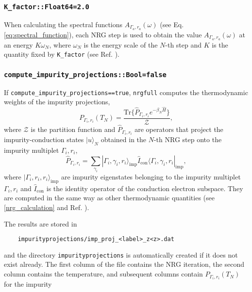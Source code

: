 \documentclass[notitlepage]{article}
\newcommand{\ket}[1]{|#1\rangle}
\newcommand{\bra}[1]{\langle #1 |}
\begin{document}
\subsubsection{\texttt{K\_factor::Float64=2.0}}
\label{nrg_Kfactor}
When calculating the spectral functions
$A_{\Gamma_a,r_a}(\omega)$ (see Eq.
\ref{eq:spectral_function}), each NRG step is used to obtain
the value $A_{\Gamma_a,r_a}(\omega)$ at an energy
$K\omega_N$, where $\omega_N$ is the energy scale of the
$N$-th step and $K$ is the quantity fixed by
\texttt{K\_factor} (see Ref. \cite{bulla2008}).

\subsubsection{\texttt{compute\_impurity\_projections::Bool=false}}
\label{nrg_computeimpurityprojections}
If \texttt{compute\_impurity\_projections==true},
\texttt{nrgfull} computes the thermodynamic weights of the
impurity projections,
\begin{equation}
    P_{\Gamma_i,r_i}(T_N)=\frac{\text{Tr}\{\hat P
    _{\Gamma_i,r_i} e^{-\beta_N \hat H}\}}{\mathcal Z},
\label{eq:impurity_projections}
\end{equation}
where $\mathcal Z$ is the partition function and
$\hat{P}_{\Gamma_i,r_i}$ are operators that project the
impurity-conduction states $\ket{u}_N$ obtained in the
$N$-th NRG step onto the impurity multiplet $\Gamma_i,r_i$,
\begin{equation}
    \hat P_{\Gamma_i,r_i} = \sum_{\gamma_i}
    \ket{\Gamma_i,\gamma_i,r_i}_\text{imp}
    \hat I _\text{con}
    \bra{\Gamma_i,\gamma_i,r_i}_\text{imp},
\label{eq:impurity_projection_operator}
\end{equation}
where $\ket{\Gamma_i,r_i,r_i}_\text{imp}$ are impurity
eigenstates belonging to the impurity multiplet
$\Gamma_i,r_i$ and $\hat I_\text{con}$ is the identity
operator of the conduction electron subspace. They are
computed in the same way as other thermodynamic quantities
(see \ref{nrg_calculation} and Ref. \cite{bulla2008}). 
\par
The results are stored in 
\begin{verbatim}
    impurityprojections/imp_proj_<label>_z<z>.dat
\end{verbatim}
and the directory \texttt{impurityprojections} is
automatically created if it does not exist already. The
first column of the file contains the NRG iteration, the
second column contains the temperature, and subsequent
columns contain $P_{\Gamma_i,r_i}(T_N)$ for the impurity
\end{document}
